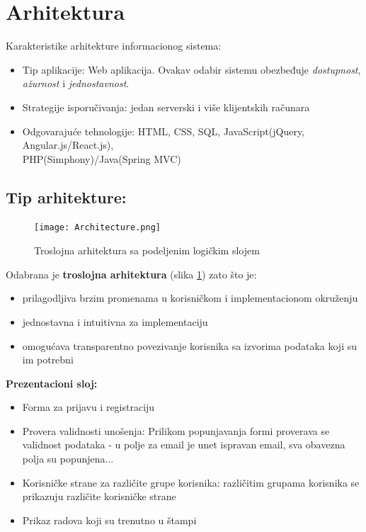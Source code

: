 \documentclass[a4paper]{article}
\begin{document}
\newpage

\section{Arhitektura}
\label{section:arhitekturasec}
    
    Karakteristike arhitekture informacionog sistema:
    \begin{itemize}
        \item Tip aplikacije: Web aplikacija. Ovakav odabir sistemu obezbeđuje \textit{dostupnost}, \textit{ažurnost} i \textit{jednostavnost}.
        \item Strategije isporučivanja: jedan serverski i više klijentskih računara
        \item Odgovarajuće tehnologije: HTML, CSS, SQL, JavaScript(jQuery, Angular.js/React.js),\\
        PHP(Simphony)/Java(Spring MVC)
    \end{itemize}
    
    \subsection{Tip arhitekture:}
    \label{sbsection:tip}
    
     \begin{figure}[hbt!]
    \centering
    \texttt{[image: Architecture.png]}
    \caption{Troslojna arhitektura sa podeljenim logičkim slojem \cite{draw}}
    \label{fig:arhitektura}
\end{figure}
    
    Odabrana je \textbf{troslojna arhitektura} (slika \ref{fig:arhitektura}) zato što je:
    \begin{itemize}
        \item prilagodljiva brzim promenama u korisničkom i implementacionom okruženju
        \item jednostavna i intuitivna za implementaciju
        \item omogućava transparentno povezivanje korisnika sa izvorima podataka koji su im potrebni
    \end{itemize}
    
    \textbf{Prezentacioni sloj:}
    \begin{itemize}
        \item Forma za prijavu i registraciju
        \item Provera validnosti unošenja: Prilikom popunjavanja formi proverava se validnost podataka - u polje za email je unet ispravan email, sva obavezna polja su popunjena...
        \item Korisničke strane za različite grupe korisnika: različitim grupama korisnika se prikazuju različite korisničke strane
        \item Prikaz radova koji su trenutno u štampi
    \end{itemize}
    
\end{document}
